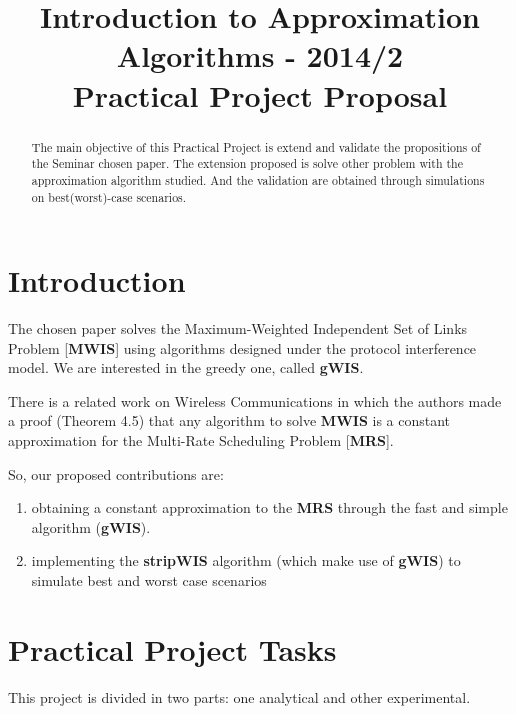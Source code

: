 \documentclass[conference]{IEEEtran}
\begin{document}
  \title{Introduction to Approximation Algorithms - 2014/2 \\ Practical Project Proposal}
  \author{
  }
  \maketitle
  \begin{abstract}
    The main objective of this Practical Project is extend and validate 
    the propositions of the Seminar chosen paper. The extension proposed
    is solve other problem with the approximation algorithm studied. And
    the validation are obtained through simulations on best(worst)-case scenarios.
  \end{abstract}
  \section{Introduction}
    The chosen paper \cite{pengjun:2014} solves the Maximum-Weighted Independent Set of Links Problem [{\bf MWIS}]
    using algorithms designed under the protocol interference model. We are interested in the greedy one, called {\bf gWIS}.

    There is a related work on Wireless Communications \cite{olga:2012} in which the authors made a proof (Theorem 4.5) that 
    any algorithm to solve {\bf MWIS} is a constant approximation for the Multi-Rate Scheduling Problem [{\bf MRS}].

    So, our proposed contributions are:
    \begin{enumerate} 
      \item obtaining a constant approximation to the {\bf MRS} through the fast and simple algorithm ({\bf gWIS}).
      \item implementing the {\bf stripWIS} algorithm (which make use of {\bf gWIS}) to simulate best and worst case scenarios
    \end{enumerate}
  \section{Practical Project Tasks}
    This project is divided in two parts: one analytical and other experimental.
\end{document}
